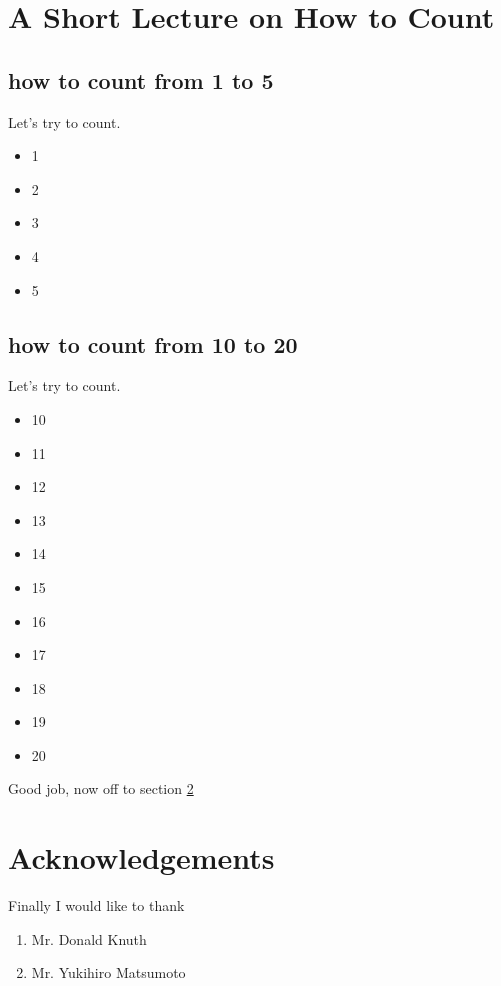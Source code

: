 \documentclass{article}
\begin{document}
\section{A Short Lecture on How to Count}
\subsection{how to count from 1 to 5}
Let's try to count.\begin{itemize}
\item{1}
\item{2}
\item{3}
\item{4}
\item{5}
\end{itemize}
\subsection{how to count from 10 to 20}
Let's try to count.\begin{itemize}
\item{10}
\item{11}
\item{12}
\item{13}
\item{14}
\item{15}
\item{16}
\item{17}
\item{18}
\item{19}
\item{20}
\end{itemize}
Good job, now off to section \ref{acks}

\section{Acknowledgements}
\label{acks}
Finally I would like to thank 
\begin{enumerate}
\item{Mr. Donald Knuth}
\item{Mr. Yukihiro Matsumoto}
\end{enumerate}
\end{document}
